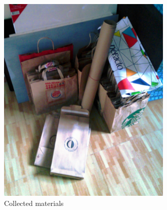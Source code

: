 \begin{figure}[h!]
  \centering
  \includegraphics[height=10cm]{project_graphics/collected_all_together.jpg}
  \caption{Collected materials}
  \label{fig:CollectedAllTogether}
\end{figure}














